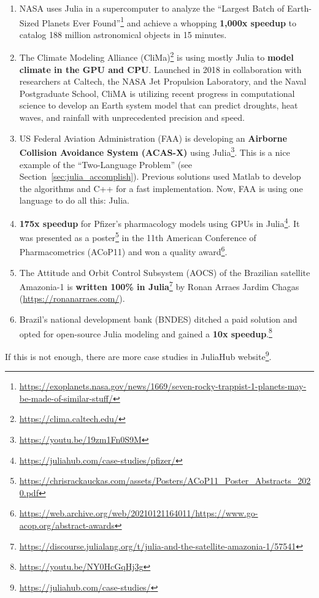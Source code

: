 \documentclass[
  notoc %
]{tufte-book}
\DeclareRobustCommand{\href}[2]{#2\footnote{\url{#1}}}
\providecommand{\tightlist}{%
  \setlength{\itemsep}{0pt}\setlength{\parskip}{0pt}
}
\begin{document}
\begin{enumerate}
\def\labelenumi{\arabic{enumi}.}
\tightlist
\item
  NASA uses Julia in a supercomputer to analyze the
  \href{https://exoplanets.nasa.gov/news/1669/seven-rocky-trappist-1-planets-may-be-made-of-similar-stuff/}{``Largest
  Batch of Earth-Sized Planets Ever Found''} and achieve a whopping
  \textbf{1,000x speedup} to catalog 188 million astronomical objects in
  15 minutes.
\item
  \href{https://clima.caltech.edu/}{The Climate Modeling Alliance
  (CliMa)} is using mostly Julia to \textbf{model climate in the GPU and
  CPU}. Launched in 2018 in collaboration with researchers at Caltech,
  the NASA Jet Propulsion Laboratory, and the Naval Postgraduate School,
  CliMA is utilizing recent progress in computational science to develop
  an Earth system model that can predict droughts, heat waves, and
  rainfall with unprecedented precision and speed.
\item
  \href{https://youtu.be/19zm1Fn0S9M}{US Federal Aviation Administration
  (FAA) is developing an \textbf{Airborne Collision Avoidance System
  (ACAS-X)} using Julia}. This is a nice example of the ``Two-Language
  Problem'' (see Section~\ref{sec:julia_accomplish}). Previous solutions
  used Matlab to develop the algorithms and C++ for a fast
  implementation. Now, FAA is using one language to do all this: Julia.
\item
  \href{https://juliahub.com/case-studies/pfizer/}{\textbf{175x speedup}
  for Pfizer's pharmacology models using GPUs in Julia}. It was
  presented as a
  \href{https://chrisrackauckas.com/assets/Posters/ACoP11_Poster_Abstracts_2020.pdf}{poster}
  in the 11th American Conference of Pharmacometrics (ACoP11) and
  \href{https://web.archive.org/web/20210121164011/https://www.go-acop.org/abstract-awards}{won
  a quality award}.
\item
  \href{https://discourse.julialang.org/t/julia-and-the-satellite-amazonia-1/57541}{The
  Attitude and Orbit Control Subsystem (AOCS) of the Brazilian satellite
  Amazonia-1 is \textbf{written 100\% in Julia}} by Ronan Arraes Jardim
  Chagas (\url{https://ronanarraes.com/}).
\item
  \href{https://youtu.be/NY0HcGqHj3g}{Brazil's national development bank
  (BNDES) ditched a paid solution and opted for open-source Julia
  modeling and gained a \textbf{10x speedup}.}
\end{enumerate}

If this is not enough, there are more case studies in
\href{https://juliahub.com/case-studies/}{JuliaHub website}.
\end{document}
